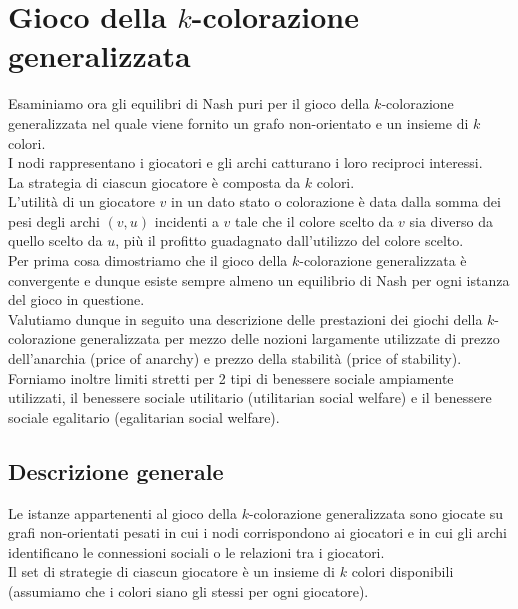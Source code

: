 \chapter{Gioco della \(k\)-colorazione generalizzata}
\justify
Esaminiamo ora gli equilibri di Nash puri per il gioco della \(k\)-colorazione generalizzata nel quale viene fornito un grafo non-orientato e un insieme di \(k\) colori.\\

I nodi rappresentano i giocatori e gli archi catturano i loro reciproci interessi.\\

La strategia di ciascun giocatore è composta da \(k\) colori.\\

L'utilità di un giocatore \(v\) in un dato stato o colorazione è data dalla somma dei pesi degli archi \((v, u)\) incidenti a \(v\) tale che il colore scelto da \(v\) sia diverso da quello scelto da \(u\), più il profitto guadagnato dall'utilizzo del colore scelto.\\

Per prima cosa dimostriamo che il gioco della \(k\)-colorazione generalizzata è convergente e dunque esiste sempre almeno un equilibrio di Nash per ogni istanza del gioco in questione.\\

Valutiamo dunque in seguito una descrizione delle prestazioni dei giochi della \(k\)-colorazione generalizzata per mezzo delle nozioni largamente utilizzate di prezzo dell'anarchia (price of anarchy) e prezzo della stabilità (price of stability).\\

Forniamo inoltre limiti stretti per 2 tipi di benessere sociale ampiamente utilizzati, il benessere sociale utilitario (utilitarian social welfare) e il benessere sociale egalitario (egalitarian social welfare).\\

\section{Descrizione generale}
\justify
Le istanze appartenenti al gioco della \(k\)-colorazione generalizzata sono giocate su grafi non-orientati pesati in cui i nodi corrispondono ai giocatori e in cui gli archi identificano le connessioni sociali o le relazioni tra i giocatori.\\

Il set di strategie di ciascun giocatore è un insieme di \(k\) colori disponibili (assumiamo che i colori siano gli stessi per ogni giocatore).\\


